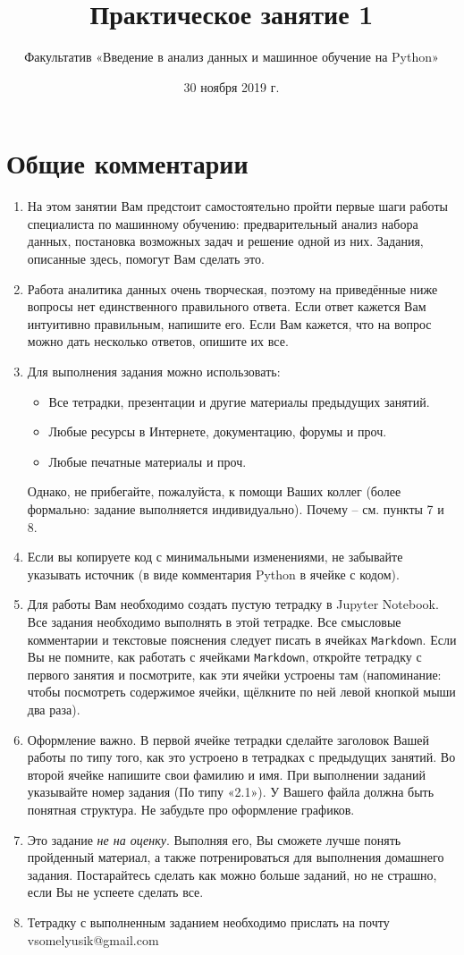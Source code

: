 \documentclass[11pt, a4paper]{extarticle}
\title{Практическое занятие 1}
\author{Факультатив «Введение в анализ данных и машинное обучение на Python»}
\date{30 ноября 2019 г.}
\begin{document}
	
	\maketitle
	
\section{Общие комментарии}
\begin{enumerate}
	\item На этом занятии Вам предстоит самостоятельно пройти первые шаги работы специалиста по машинному обучению: предварительный анализ набора данных, постановка возможных задач и решение одной из них. Задания, описанные здесь, помогут Вам сделать это.
	\item Работа аналитика данных очень творческая, поэтому на приведённые ниже вопросы нет единственного правильного ответа. Если ответ кажется Вам интуитивно правильным, напишите его. Если Вам кажется, что на вопрос можно дать несколько ответов, опишите их все.
	\item Для выполнения задания можно использовать: 
	\begin{itemize}
		\item Все тетрадки, презентации и другие материалы предыдущих занятий.
		\item Любые ресурсы в Интернете, документацию, форумы и проч. 
		\item Любые печатные материалы и проч. 
	\end{itemize}
	Однако, не прибегайте, пожалуйста, к помощи Ваших коллег (более формально: задание выполняется индивидуально). Почему – см. пункты 7 и 8.
	\item Если вы копируете код с минимальными изменениями, не забывайте указывать источник (в виде комментария Python в ячейке с кодом).
	\item Для работы Вам необходимо создать пустую тетрадку в Jupyter Notebook. Все задания необходимо выполнять в этой тетрадке. Все смысловые комментарии и текстовые пояснения следует писать в ячейках {\tt Markdown}. Если Вы не помните, как работать с ячейками {\tt Markdown}, откройте тетрадку с первого занятия и посмотрите, как эти ячейки устроены там (напоминание: чтобы посмотреть содержимое ячейки, щёлкните по ней левой кнопкой мыши два раза). 
	\item Оформление важно. В первой ячейке тетрадки сделайте заголовок Вашей работы по типу того, как это устроено в тетрадках с предыдущих занятий. Во второй ячейке напишите свои фамилию и имя. При выполнении заданий указывайте номер задания (По типу «2.1»). У Вашего файла должна быть понятная структура. Не забудьте про оформление графиков.
	\item Это задание \textit{не на оценку}. Выполняя его, Вы сможете лучше понять пройденный материал, а также потренироваться для выполнения домашнего задания. Постарайтесь сделать как можно больше заданий, но не страшно, если Вы не успеете сделать все. 
	\item Тетрадку с выполненным заданием необходимо прислать на почту vsomelyusik@gmail.com
	

\end{enumerate}
\end{document}
